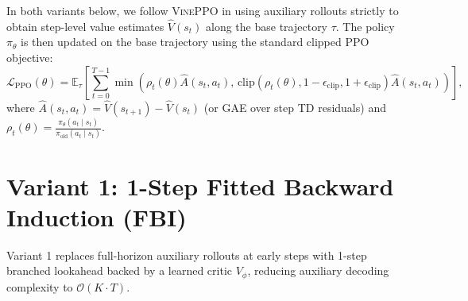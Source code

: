 \documentclass[11pt,a4paper]{article}
\newcommand{\E}{\mathbb{E}}
\begin{document}
In both variants below, we follow \textsc{VinePPO} in using auxiliary rollouts strictly to obtain step-level value estimates $\hat{V}(s_t)$ along the base trajectory $\tau$. The policy $\pi_\theta$ is then updated on the base trajectory using the standard clipped PPO objective:
\begin{equation}
    \mathcal{L}_{\text{PPO}}(\theta) = \E_{\tau} \left[ \sum_{t=0}^{T-1} \min\!\left( \rho_t(\theta) \hat{A}(s_t, a_t), \, \text{clip}(\rho_t(\theta), 1-\epsilon_{\text{clip}}, 1+\epsilon_{\text{clip}}) \hat{A}(s_t, a_t) \right) \right],
    \label{eq:ppo_actor}
\end{equation}
where $\hat{A}(s_t, a_t) = \hat{V}(s_{t+1}) - \hat{V}(s_t)$ (or GAE over step TD residuals) and $\rho_t(\theta) = \frac{\pi_\theta(a_t \mid s_t)}{\pi_{\text{old}}(a_t \mid s_t)}$.

\section{Variant 1: 1-Step Fitted Backward Induction (FBI)}
\label{sec:fbi}

Variant 1 replaces full-horizon auxiliary rollouts at early steps with 1-step branched lookahead backed by a learned critic $V_\phi$, reducing auxiliary decoding complexity to $\mathcal{O}(K \cdot T)$.
\end{document}
